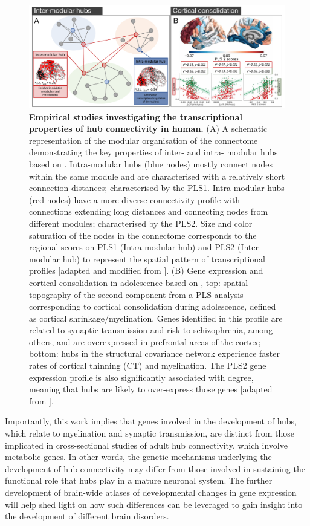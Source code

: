 \begin{figure}[H]
\begin{center}
\includegraphics[width=1\textwidth]{Chapter3/Ch3Fig4.pdf}%
\end{center}
\caption{\textbf{Empirical studies investigating the transcriptional properties of hub connectivity in human.}
(A) A schematic representation of the modular organisation of the connectome demonstrating the key properties of inter- and intra- modular hubs based on \citet{Vertes2016b}.
Intra-modular hubs (blue nodes) mostly connect nodes within the same module and are characterised with a relatively short connection distances; characterised by the PLS1. Intra-modular hubs (red nodes) have a more diverse connectivity profile with connections extending long distances and connecting nodes from different modules; characterised by the PLS2. Size and color saturation of the nodes in the connectome corresponds to the regional scores on PLS1 (Intra-modular hub) and PLS2 (Inter-modular hub) to represent the spatial pattern of transcriptional profiles [adapted and modified from \citet{Vertes2016b}].
(B) Gene expression and cortical consolidation in adolescence based on \citet{Whitaker2016a},
top: spatial topography of the second component from a PLS analysis corresponding to cortical consolidation during adolescence, defined as cortical shrinkage/myelination. Genes identified in this profile are related to synaptic transmission and risk to schizophrenia, among others, and are overexpressed in prefrontal areas of the cortex; bottom: hubs in the structural covariance network experience faster rates of cortical thinning (CT) and myelination. The PLS2 gene expression profile is also significantly associated with degree, meaning that hubs are likely to over-express those genes [adapted from \citet{Whitaker2016a}]. } \label{fig:Ch3Fig4}
\end{figure}

Importantly, this work implies that genes involved in the development of hubs, which relate to myelination and synaptic transmission, are distinct from those implicated in cross-sectional studies of adult hub connectivity, which involve metabolic genes. In other words, the genetic mechanisms underlying the development of hub connectivity may differ from those involved in sustaining the functional role that hubs play in a mature neuronal system. The further development of brain-wide atlases of developmental changes in gene expression will help shed light on how such differences can be leveraged to gain insight into the development of different brain disorders.

